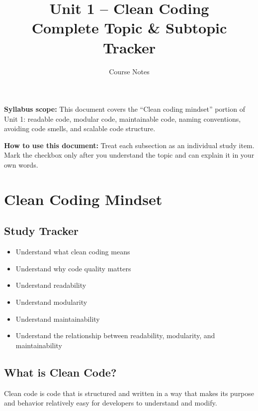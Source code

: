\documentclass[11pt,a4paper]{article}
\title{
    \vspace{-1cm}
    \textbf{Unit 1 -- Clean Coding}\\
    \large Complete Topic \& Subtopic Tracker
}
\author{Course Notes}
\date{}
\newcommand{\checkitem}{$\square$}
\begin{document}
\maketitle

\begin{conceptbox}
\textbf{Syllabus scope:} This document covers the ``Clean coding mindset'' portion of Unit 1:
readable code, modular code, maintainable code, naming conventions, avoiding code smells,
and scalable code structure.

\vspace{2mm}

\textbf{How to use this document:} Treat each subsection as an individual study item.
Mark the checkbox only after you understand the topic and can explain it in your own words.
\end{conceptbox}

\tableofcontents
\newpage

\section{Clean Coding Mindset}

\subsection{Study Tracker}

\begin{itemize}[label=\checkitem]
    \item Understand what clean coding means
    \item Understand why code quality matters
    \item Understand readability
    \item Understand modularity
    \item Understand maintainability
    \item Understand the relationship between readability, modularity, and maintainability
\end{itemize}

\subsection{What is Clean Code?}

Clean code is code that is structured and written in a way that makes its purpose
and behavior relatively easy for developers to understand and modify.
\end{document}
